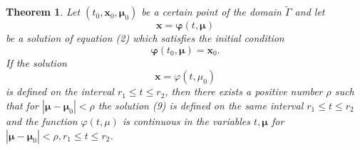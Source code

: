 \documentclass[10pt,a5paper]{book}
\theoremstyle{plain}
\newtheorem{theorem}{Theorem}
\theoremstyle{definition}
\theoremstyle{remark}
\begin{document}
\begin{theorem}
Let $\left(t_{0}, \mathbf{x}_{0}, \boldsymbol{\mu}_{0}\right)$ be a certain point of the domain $\widetilde{\Gamma}$ and let
\begin{equation*}
\mathbf{x}=\boldsymbol{\varphi}(t, \boldsymbol{\mu}) \tag{9}
\end{equation*}
be a solution of equation (2) which satisfies the initial condition
\[
\boldsymbol{\varphi}\left(t_{0}, \boldsymbol{\mu}\right)=\mathbf{x}_{0} .
\]
If the solution
\[
\mathbf{x}=\varphi\left(t, \mu_{0}\right)
\]
is defined on the interval $r_{1} \leq t \leq r_{2}$, then there exists a positive number $\rho$ such that for $\left|\boldsymbol{\mu}-\boldsymbol{\mu}_{0}\right|<\rho$ the solution (9) is defined on the same interval $r_{1} \leq t \leq r_{2}$ and the function $\varphi(t, \mu)$ is continuous in the variables $t, \boldsymbol{\mu}$ for $\left|\boldsymbol{\mu}-\boldsymbol{\mu}_{0}\right|<\rho, r_{1} \leq t \leq r_{2}$.
\end{theorem}
\end{document}
